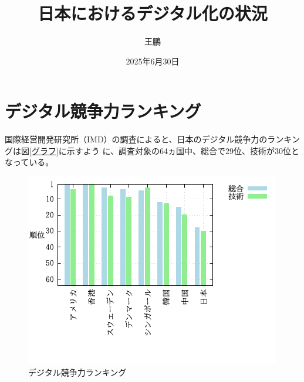 \documentclass[a4paper,11pt,dvipdfmx]{ujarticle}
\title{日本におけるデジタル化の状況}
\author{王鵬}
\date{2025年6月30日}
\begin{document}
\maketitle %

\section{デジタル競争力ランキング}


国際経営開発研究所（IMD）の調査\cite{imd}によると、日本のデジタル競争力のランキングは図\ref{グラフ}に示すよう
に、調査対象の64ヵ国中、総合で29位、技術が30位となっている。

\begin{figure}[htbp]
    \centering
    \includegraphics[width=0.7\linewidth]{グラフ.png}
    \caption{デジタル競争力ランキング}\label{fig:グラフ}
\end{figure}


\end{document}
